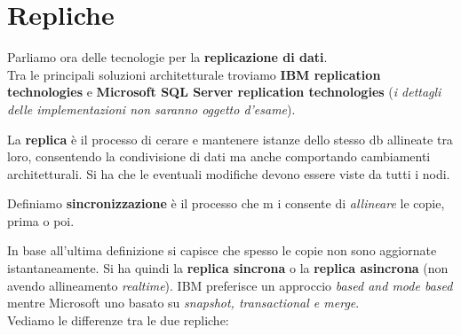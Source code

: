 \documentclass[a4paper,12pt, oneside]{book}
\begin{document}
\section{Repliche}
Parliamo ora delle tecnologie per la \textbf{replicazione di dati}.\\
Tra le principali soluzioni architetturale troviamo \textbf{IBM replication
  technologies} e \textbf{Microsoft SQL Server replication technologies}
(\textit{i dettagli delle implementazioni non saranno oggetto d'esame}).\\
\begin{definizione}
  La \textbf{replica} è il processo di cerare e mantenere istanze dello stesso
  db allineate tra loro, consentendo la condivisione di dati ma anche
  comportando cambiamenti architetturali. Si ha che le eventuali modifiche
  devono essere viste da tutti i nodi.
\end{definizione}
\begin{definizione}
  Definiamo \textbf{sincronizzazione} è il processo che m i consente di
  \textit{allineare} le copie, prima o poi.
\end{definizione}
In base all'ultima definizione si capisce che spesso le copie non sono
aggiornate istantaneamente. Si ha quindi la \textbf{replica sincrona} o la
\textbf{replica asincrona} (non avendo allineamento \textit{realtime}). IBM
preferisce un approccio \textit{based and mode based} mentre Microsoft uno
basato su \textit{snapshot, transactional \textnormal{e} merge}.\\
Vediamo le differenze tra le due repliche:
\end{document}
